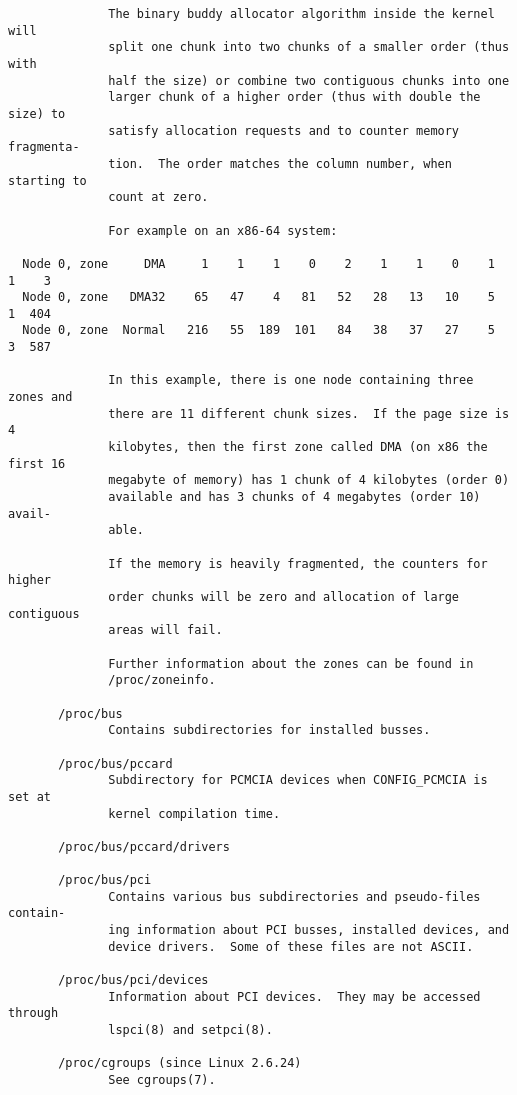 \documentclass[]{article}
\begin{document}
\begin{verbatim}
              The binary buddy allocator algorithm inside the kernel will
              split one chunk into two chunks of a smaller order (thus with
              half the size) or combine two contiguous chunks into one
              larger chunk of a higher order (thus with double the size) to
              satisfy allocation requests and to counter memory fragmenta‐
              tion.  The order matches the column number, when starting to
              count at zero.

              For example on an x86-64 system:

  Node 0, zone     DMA     1    1    1    0    2    1    1    0    1    1    3
  Node 0, zone   DMA32    65   47    4   81   52   28   13   10    5    1  404
  Node 0, zone  Normal   216   55  189  101   84   38   37   27    5    3  587

              In this example, there is one node containing three zones and
              there are 11 different chunk sizes.  If the page size is 4
              kilobytes, then the first zone called DMA (on x86 the first 16
              megabyte of memory) has 1 chunk of 4 kilobytes (order 0)
              available and has 3 chunks of 4 megabytes (order 10) avail‐
              able.

              If the memory is heavily fragmented, the counters for higher
              order chunks will be zero and allocation of large contiguous
              areas will fail.

              Further information about the zones can be found in
              /proc/zoneinfo.

       /proc/bus
              Contains subdirectories for installed busses.

       /proc/bus/pccard
              Subdirectory for PCMCIA devices when CONFIG_PCMCIA is set at
              kernel compilation time.

       /proc/bus/pccard/drivers

       /proc/bus/pci
              Contains various bus subdirectories and pseudo-files contain‐
              ing information about PCI busses, installed devices, and
              device drivers.  Some of these files are not ASCII.

       /proc/bus/pci/devices
              Information about PCI devices.  They may be accessed through
              lspci(8) and setpci(8).

       /proc/cgroups (since Linux 2.6.24)
              See cgroups(7).


\end{verbatim}
\end{document}
